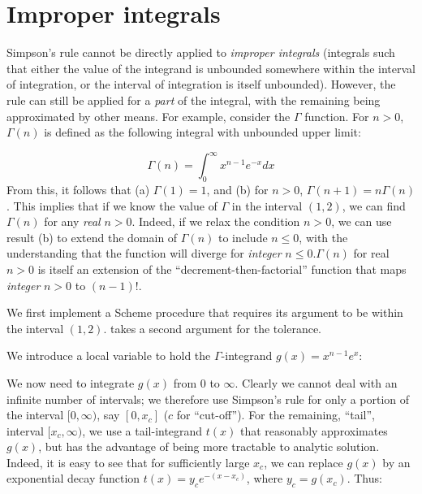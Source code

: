 \section{Improper integrals}

Simpson's rule cannot be directly applied to {\em
improper integrals} (integrals such that either
the value of the integrand is unbounded somewhere
within the interval of integration, or the interval of
integration is itself unbounded).  However, the rule can still be 
applied for a {\em part} of the integral, with the
remaining being approximated by other means.  For
example, consider the $\Gamma$ function.
For $n > 0$, $\Gamma(n)$ is defined as the
following integral with unbounded upper limit:

$$ \Gamma(n) = \int_0^{\infty} x^{n-1}e^{-x} dx $$
%
From this, it follows that (a) $\Gamma(1) = 1$, and (b)
for $n > 0$, $\Gamma(n+1) = n\Gamma(n)$.  This implies
that if we know the value of $\Gamma$ in the interval
$(1, 2)$, we can find $\Gamma(n)$ for any {\em real} $n > 0$.
Indeed, if we relax the condition $n > 0$, we can use
result (b) to extend the domain of $\Gamma(n)$ to
include $n \le 0$, with the understanding that the function
will diverge for {\em integer} $n \le 0$.\f{$\Gamma(n)$ for real $n > 0$ is
itself an extension of the ``decrement-then-factorial'' function
that maps {\em integer} $n > 0$ to $(n-1)!$.}

We first implement a Scheme procedure 
that requires its argument  to be within the
interval $(1, 2)$.   takes a
second argument  for the tolerance.


\n
We introduce a local variable  to hold
the $\Gamma$-integrand $g(x) = x^{n-1}e^x$:

             
\n We now need to integrate $g(x)$ from 0 to $\infty$.
Clearly we cannot deal with an infinite number of
intervals; we therefore use Simpson's rule for only a
portion of the interval $[0, \infty)$, say $[0, x_c]$
($c$ for ``cut-off'').  For the remaining, ``tail'',
interval $[x_c, \infty)$, we use a tail-integrand
$t(x)$ that reasonably approximates $g(x)$, but has the
advantage of being more tractable to analytic solution.
Indeed, it is easy to see that for sufficiently large
$x_c$, we can replace $g(x)$ by an exponential decay
function $t(x) = y_c e^{-(x - x_c )}$, where $y_c
= g(x_c)$.  Thus:

